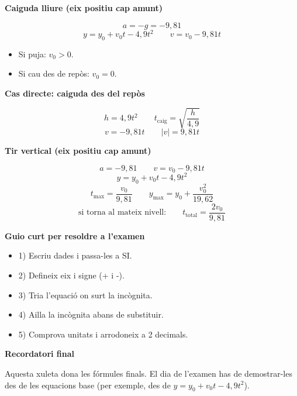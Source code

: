 \documentclass[10pt,a4paper]{extarticle}
\newcommand{\subhead}[1]{%
	\vspace{0.08cm}
	\colorbox{subbg}{\parbox{\dimexpr\linewidth-2\fboxsep\relax}{\textbf{\color{ink}#1}}}
	\vspace{0.03cm}
}
\newcommand{\examnote}[1]{%
	{\small\color{muted}#1}
}
\begin{document}
\subhead{Caiguda lliure (eix positiu cap amunt)}
\[
a=-g=-9{,}81
\]
\[
y=y_0+v_0t-4{,}9t^2
\qquad
v=v_0-9{,}81t
\]
\begin{itemize}
\item Si puja: $v_0>0$.
\item Si cau des de rep\`os: $v_0=0$.
\end{itemize}

\subhead{Cas directe: caiguda des del rep\`os}
\[
h=4{,}9t^2
\qquad
t_{\text{caig}}=\sqrt{\frac{h}{4{,}9}}
\]
\[
v=-9{,}81t
\qquad
|v|=9{,}81t
\]

\subhead{Tir vertical (eix positiu cap amunt)}
\[
a=-9{,}81
\qquad
v=v_0-9{,}81t
\]
\[
y=y_0+v_0t-4{,}9t^2
\]
\[
t_{\max}=\frac{v_0}{9{,}81}
\qquad
y_{\max}=y_0+\frac{v_0^2}{19{,}62}
\]
\[
\text{si torna al mateix nivell:}\qquad t_{\text{total}}=\frac{2v_0}{9{,}81}
\]

\subhead{Guio curt per resoldre a l'examen}
\begin{itemize}
\item 1) Escriu dades i passa-les a SI.
\item 2) Defineix eix i signe (+ i -).
\item 3) Tria l'equaci\'o on surt la inc\`ognita.
\item 4) Ailla la inc\`ognita abans de substituir.
\item 5) Comprova unitats i arrodoneix a 2 decimals.
\end{itemize}

\subhead{Recordatori final}
\examnote{Aquesta xuleta dona les f\'ormules finals. El dia de l'examen has de demostrar-les des de les equacions base (per exemple, des de $y=y_0+v_0t-4{,}9t^2$).}
\end{document}
